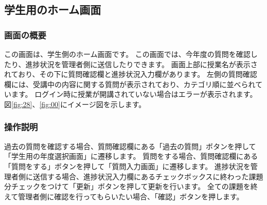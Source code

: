 \newpage

\subsection{学生用のホーム画面}
\subsubsection{画面の概要}
この画面は、学生側のホーム画面です。
この画面では、今年度の質問を確認したり、進捗状況を管理者側に送信したりできます。
画面上部に授業名が表示されており、その下に質問確認欄と進捗状況入力欄があります。
左側の質問確認欄には、受講中の内容に関する質問が表示されており、カテゴリ順に並べられています。
ログイン時に授業が開講されていない場合はエラーが表示されます。
図\ref{fig:28}、\ref{fig:00}にイメージ図を示します。

\subsubsection{操作説明}
過去の質問を確認する場合、質問確認欄にある「過去の質問」ボタンを押して「学生用の年度選択画面」に遷移します。
質問をする場合、質問確認欄にある「質問をする」ボタンを押して「質問入力画面」に遷移します。
進捗状況を管理者側に送信する場合、進捗状況入力欄にあるチェックボックスに終わった課題分チェックをつけて「更新」ボタンを押して更新を行います。
全ての課題を終えて管理者側に確認を行ってもらいたい場合、「確認」ボタンを押します。



